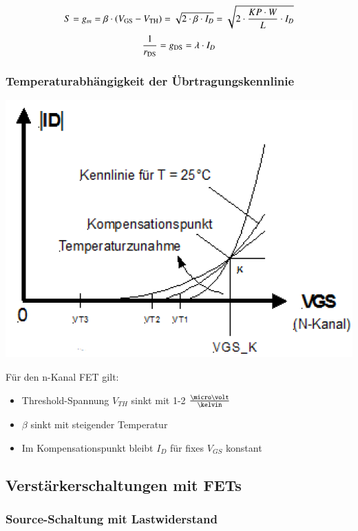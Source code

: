 $$ S = g_m = \beta \cdot (V_{\rm GS} - V_{\rm TH}) = \sqrt{2 \cdot \beta \cdot I_D} = \sqrt{ 2 \cdot \frac{KP \cdot W}{L} \cdot I_D} $$
$$ \frac{1}{r_{\rm DS}} = g_{\rm DS} = \lambda \cdot I_D $$


\subsubsection{Temperaturabhängigkeit der Übrtragungskennlinie}

\begin{minipage}[c]{0.4\columnwidth}
    \includegraphics[width= \columnwidth]{images/mos_fet_eingangskennlinie_temperatur.png}
\end{minipage}
\hfill
\begin{minipage}[c]{0.58\columnwidth}
    Für den n-Kanal FET gilt:
    \begin{itemize}
        \item Threshold-Spannung $V_{TH}$ sinkt mit 1-2 $\frac{\micro \volt}{\kelvin}$
        \item $\beta$ sinkt mit steigender Temperatur
        \item Im Kompensationspunkt bleibt $I_D$ für fixes $V_{GS}$ konstant
    \end{itemize}
\end{minipage}

    
\subsection{Verstärkerschaltungen mit FETs}

\subsubsection{Source-Schaltung mit Lastwiderstand}

